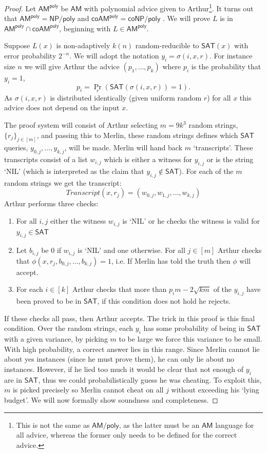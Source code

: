 \documentclass{article}
\begin{document}
\begin{proof}
    Let $\mathsf{AM^{poly}}$ be $\mathsf{AM}$ with polynomial advice given to Arthur\footnote{ This is not the same as $\mathsf{AM/poly}$, as the latter must be an $\mathsf{AM}$ language for all advice, whereas the former only needs to be defined for the correct advice.}. It turns out that $\mathsf{AM^{poly}=NP/poly}$ and $\mathsf{coAM^{poly}=coNP/poly}$ \cite{feigenbaum1990random}.
    We will prove $L$ is in $\mathsf{AM^{poly}\cap coAM^{poly}}$, beginning with $L \in \mathsf{AM^{poly}}$.

    Suppose $L(x)$ is non-adaptively $k(n)$ random-reducible to $\mathsf{SAT}(x)$ with error probability $2^{-n}$. We will adopt the notation $y_i=\sigma(i,x,r)$. For instance size $n$ we will give Arthur the advice $(p_1,\ldots, p_k)$ where $p_i$ is the probability that $y_i=1$,
    \[
    p_i=\Pr_{r}(\mathsf{SAT}(\sigma(i, x,r))=1).
    \]
    As $\sigma(i, x,r)$ is distributed identically (given uniform random $r$) for all $x$ this advice does not depend on the input $x$.

    The proof system will consist of Arthur selecting $m=9k^3$ random strings, $\{r_j\}_{j\in[m]}$, and passing this to Merlin, these random strings defines which $\mathsf{SAT}$ queries, $y_{0,j},\ldots, y_{k,j}$, will be made. Merlin will hand back $m$ `transcripts'. These transcripts consist of a list $w_{i,j}$ which is either a witness for $y_{i,j}$ or is the string `NIL' (which is interpreted as the claim that $y_{i,j}\notin \mathsf{SAT}$). For each of the $m$ random strings we get the transcript:
    \[
    Transcript(x,r_j)= (w_{0,j},w_{1,j}, \ldots, w_{k,j})
    \]
    Arthur performs three checks:
    \begin{enumerate}[label={(\arabic*)}]
        \item For all $i,j$ either the witness $w_{i,j}$ is `NIL' or he checks the witness is valid for $y_{i,j}\in \mathsf{SAT}$
        \item Let $b_{i,j}$ be 0 if $w_{i,j}$ is `NIL' and one otherwise. For all $j\in [m]$ Arthur checks that $\phi(x,r_j, b_{0,j}, \ldots, b_{k,j})=1$, i.e. If Merlin has told the truth then $\phi$ will accept.
        \item For each $i\in [k]$ Arthur checks that more than $p_im-2\sqrt{km}$ of the $y_{i,j}$ have been proved to be in $\mathsf{SAT}$, if this condition does not hold he rejects.
    \end{enumerate}
    If these checks all pass, then Arthur accepts. 
    The trick in this proof is this final condition. Over the random strings, each $y_i$ has some probability of being in $\mathsf{SAT}$ with a given variance, by picking $m$ to be large we force this variance to be small. With high probability, a correct answer lies in this range. Since Merlin cannot lie about yes instances (since he must prove them), he can only lie about no instances. However, if he lied too much it would be clear that not enough of $y_i$ are in $\mathsf{SAT}$, thus we could probabilistically guess he was cheating. To exploit this, $m$ is picked precisely so Merlin cannot cheat on all $j$ without exceeding his `lying budget'. We will now formally show soundness and completeness.


\end{proof}
\end{document}
